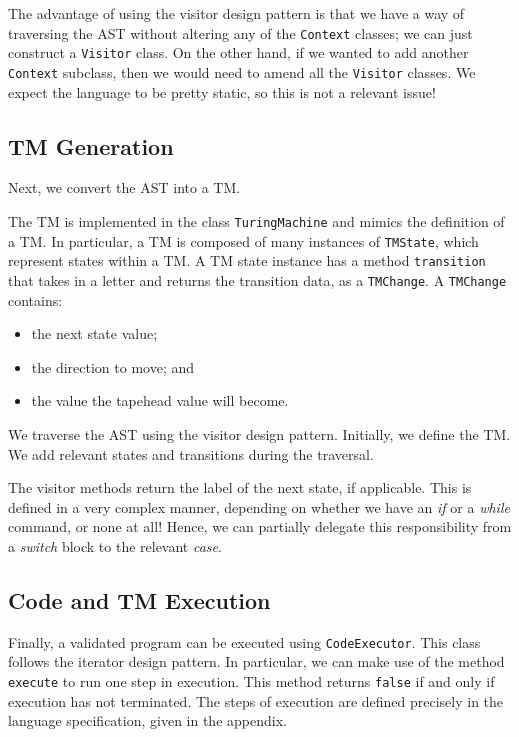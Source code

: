 The advantage of using the visitor design pattern is that we have a way of traversing the AST without altering any of the \texttt{Context} classes; we can just construct a \texttt{Visitor} class. On the other hand, if we wanted to add another \texttt{Context} subclass, then we would need to amend all the \texttt{Visitor} classes. We expect the language to be pretty static, so this is not a relevant issue!

\subsection{TM Generation}
Next, we convert the AST into a TM. 

The TM is implemented in the class \texttt{TuringMachine} and mimics the definition of a TM. In particular, a TM is composed of many instances of \texttt{TMState}, which represent states within a TM. A TM state instance has a method \texttt{transition} that takes in a letter and returns the transition data, as a \texttt{TMChange}. A \texttt{TMChange} contains:
\begin{itemize}
    \item the next state value;
    \item the direction to move; and
    \item the value the tapehead value will become.
\end{itemize}

We traverse the AST using the visitor design pattern. Initially, we define the TM. We add relevant states and transitions during the traversal. 

The visitor methods return the label of the next state, if applicable. This is defined in a very complex manner, depending on whether we have an \textit{if} or a \textit{while} command, or none at all! Hence, we can partially delegate this responsibility from a \textit{switch} block to the relevant \textit{case}.

\subsection{Code and TM Execution}
Finally, a validated program can be executed using \texttt{CodeExecutor}. This class follows the iterator design pattern. In particular, we can make use of the method \texttt{execute} to run one step in execution. This method returns \texttt{false} if and only if execution has not terminated. The steps of execution are defined precisely in the language specification, given in the appendix.

